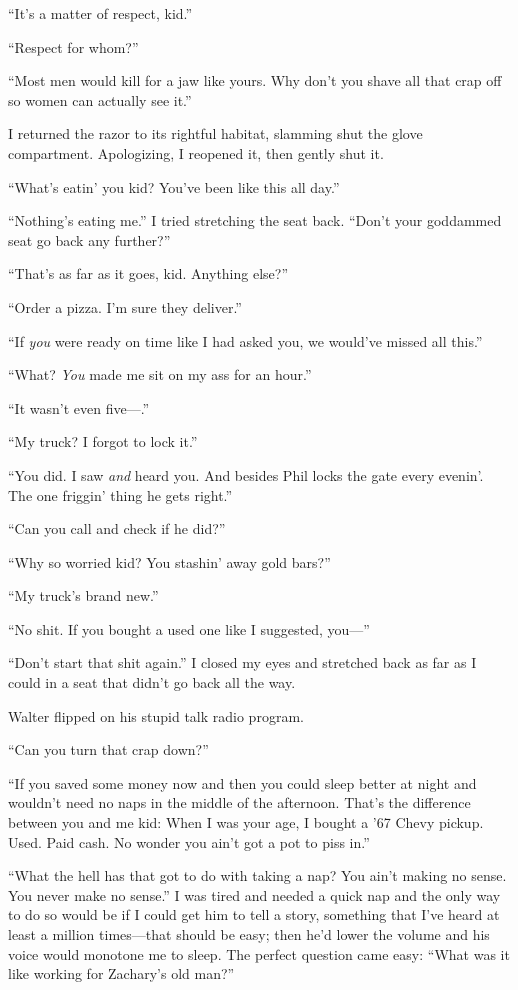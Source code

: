 ``It's a matter of respect, kid.''

``Respect for whom?''

``Most men would kill for a jaw like yours. Why don't you shave all that
crap off so women can actually see it.''

I returned the razor to its rightful habitat, slamming shut the glove
compartment. Apologizing, I reopened it, then gently shut it.

``What's eatin' you kid? You've been like this all day.''

``Nothing's eating me.'' I tried stretching the seat back. ``Don't your
goddammed seat go back any further?''

``That's as far as it goes, kid. Anything else?''

``Order a pizza. I'm sure they deliver.''

``If \emph{you} were ready on time like I had asked you, we would've
missed all this.''

``What? \emph{You} made me sit on my ass for an hour.''

``It wasn't even five---.''

``My truck? I forgot to lock it.''

``You did. I saw \emph{and} heard you. And besides Phil locks the gate
every evenin'. The one friggin' thing he gets right.''

``Can you call and check if he did?''

``Why so worried kid? You stashin' away gold bars?''

``My truck's brand new.''

``No shit. If you bought a used one like I suggested, you---''

``Don't start that shit again.'' I closed my eyes and stretched back as
far as I could in a seat that didn't go back all the way.

Walter flipped on his stupid talk radio program.

``Can you turn that crap down?''

``If you saved some money now and then you could sleep better at night
and wouldn't need no naps in the middle of the afternoon. That's the
difference between you and me kid: When I was your age, I bought a '67
Chevy pickup. Used. Paid cash. No wonder you ain't got a pot to piss
in.''

``What the hell has that got to do with taking a nap? You ain't making
no sense. You never make no sense.'' I was tired and needed a quick nap
and the only way to do so would be if I could get him to tell a story,
something that I've heard at least a million times---that should be
easy; then he'd lower the volume and his voice would monotone me to
sleep. The perfect question came easy: ``What was it like working for
Zachary's old man?''

